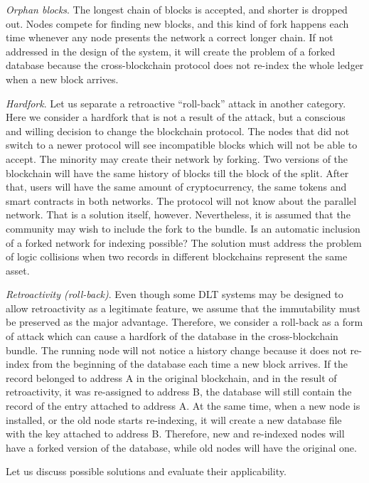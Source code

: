 \begin{multicols}{2}
\textit{Orphan blocks}. The longest chain of blocks is accepted, and shorter is dropped out. Nodes compete for finding new blocks, and this kind of fork happens each time whenever any node presents the network a correct longer chain. If not addressed in the design of the system, it will create the problem of a forked database because the cross-blockchain protocol does not re-index the whole ledger when a new block arrives.

\textit{Hardfork}. Let us separate a retroactive “roll-back” attack in another category. Here we consider a hardfork that is not a result of the attack, but a conscious and willing decision to change the blockchain protocol. The nodes that did not switch to a newer protocol will see incompatible blocks which will not be able to accept. The minority may create their network by forking. Two versions of the blockchain will have the same history of blocks till the block of the split. After that, users will have the same amount of cryptocurrency, the same tokens and smart contracts in both networks. The protocol will not know about the parallel network. That is a solution itself, however. Nevertheless, it is assumed that the community may wish to include the fork to the bundle. Is an automatic inclusion of a forked network for indexing possible? The solution must address the problem of logic collisions when two records in different blockchains represent the same asset.

\textit{Retroactivity (roll-back)}. Even though some DLT systems may be designed to allow retroactivity as a legitimate feature, we assume that the immutability must be preserved as the major advantage. Therefore, we consider a roll-back as a form of attack which can cause a hardfork of the database in the cross-blockchain bundle. The running node will not notice a history change because it does not re-index from the beginning of the database each time a new block arrives. If the record belonged to address A in the original blockchain, and in the result of retroactivity, it was re-assigned to address B, the database will still contain the record of the entry attached to address A. At the same time, when a new node is installed, or the old node starts re-indexing, it will create a new database file with the key attached to address B. Therefore, new and re-indexed nodes will have a forked version of the database, while old nodes will have the original one.

Let us discuss possible solutions and evaluate their applicability.


\end{multicols}
